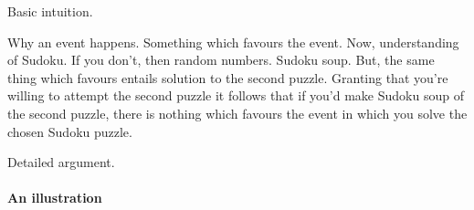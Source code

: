 \begin{note}
  Basic intuition.

  Why an event happens.
  Something which favours the event.
  Now, understanding of Sudoku.
  If you don't, then random numbers.
  Sudoku soup.
  But, the same thing which favours entails solution to the second puzzle.
  Granting that you're willing to attempt the second puzzle it follows that if you'd make Sudoku soup of the second puzzle, there is nothing which favours the event in which you solve the chosen Sudoku puzzle.
\end{note}


\begin{note}
  Detailed argument.
\end{note}



\paragraph*{An illustration}


